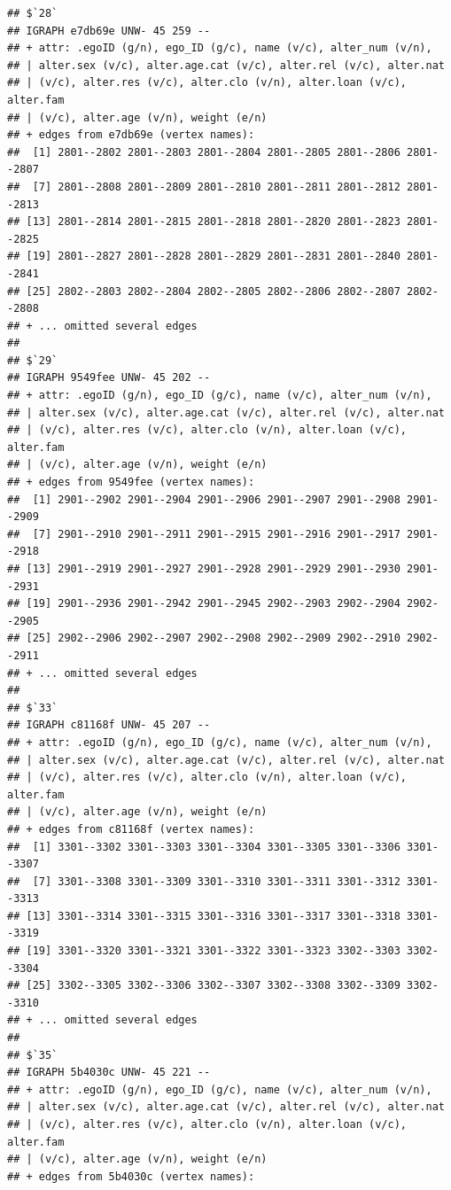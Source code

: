 \documentclass[
]{book}
\begin{document}
\begin{verbatim}
## $`28`
## IGRAPH e7db69e UNW- 45 259 -- 
## + attr: .egoID (g/n), ego_ID (g/c), name (v/c), alter_num (v/n),
## | alter.sex (v/c), alter.age.cat (v/c), alter.rel (v/c), alter.nat
## | (v/c), alter.res (v/c), alter.clo (v/n), alter.loan (v/c), alter.fam
## | (v/c), alter.age (v/n), weight (e/n)
## + edges from e7db69e (vertex names):
##  [1] 2801--2802 2801--2803 2801--2804 2801--2805 2801--2806 2801--2807
##  [7] 2801--2808 2801--2809 2801--2810 2801--2811 2801--2812 2801--2813
## [13] 2801--2814 2801--2815 2801--2818 2801--2820 2801--2823 2801--2825
## [19] 2801--2827 2801--2828 2801--2829 2801--2831 2801--2840 2801--2841
## [25] 2802--2803 2802--2804 2802--2805 2802--2806 2802--2807 2802--2808
## + ... omitted several edges
## 
## $`29`
## IGRAPH 9549fee UNW- 45 202 -- 
## + attr: .egoID (g/n), ego_ID (g/c), name (v/c), alter_num (v/n),
## | alter.sex (v/c), alter.age.cat (v/c), alter.rel (v/c), alter.nat
## | (v/c), alter.res (v/c), alter.clo (v/n), alter.loan (v/c), alter.fam
## | (v/c), alter.age (v/n), weight (e/n)
## + edges from 9549fee (vertex names):
##  [1] 2901--2902 2901--2904 2901--2906 2901--2907 2901--2908 2901--2909
##  [7] 2901--2910 2901--2911 2901--2915 2901--2916 2901--2917 2901--2918
## [13] 2901--2919 2901--2927 2901--2928 2901--2929 2901--2930 2901--2931
## [19] 2901--2936 2901--2942 2901--2945 2902--2903 2902--2904 2902--2905
## [25] 2902--2906 2902--2907 2902--2908 2902--2909 2902--2910 2902--2911
## + ... omitted several edges
## 
## $`33`
## IGRAPH c81168f UNW- 45 207 -- 
## + attr: .egoID (g/n), ego_ID (g/c), name (v/c), alter_num (v/n),
## | alter.sex (v/c), alter.age.cat (v/c), alter.rel (v/c), alter.nat
## | (v/c), alter.res (v/c), alter.clo (v/n), alter.loan (v/c), alter.fam
## | (v/c), alter.age (v/n), weight (e/n)
## + edges from c81168f (vertex names):
##  [1] 3301--3302 3301--3303 3301--3304 3301--3305 3301--3306 3301--3307
##  [7] 3301--3308 3301--3309 3301--3310 3301--3311 3301--3312 3301--3313
## [13] 3301--3314 3301--3315 3301--3316 3301--3317 3301--3318 3301--3319
## [19] 3301--3320 3301--3321 3301--3322 3301--3323 3302--3303 3302--3304
## [25] 3302--3305 3302--3306 3302--3307 3302--3308 3302--3309 3302--3310
## + ... omitted several edges
## 
## $`35`
## IGRAPH 5b4030c UNW- 45 221 -- 
## + attr: .egoID (g/n), ego_ID (g/c), name (v/c), alter_num (v/n),
## | alter.sex (v/c), alter.age.cat (v/c), alter.rel (v/c), alter.nat
## | (v/c), alter.res (v/c), alter.clo (v/n), alter.loan (v/c), alter.fam
## | (v/c), alter.age (v/n), weight (e/n)
## + edges from 5b4030c (vertex names):

\end{verbatim}
\end{document}
